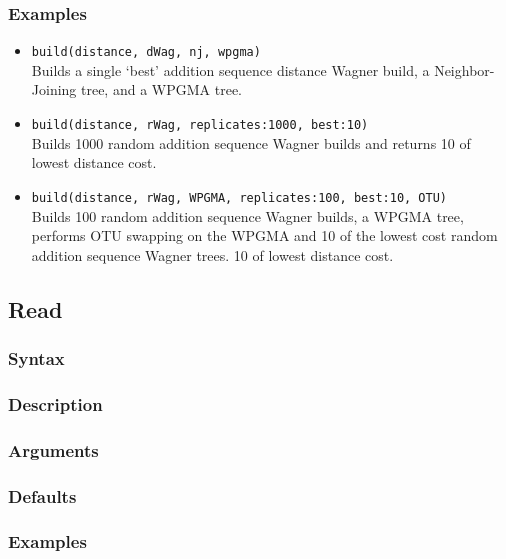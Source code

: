 \documentclass[11pt]{article}
\begin{document}
		\subsubsection{Examples}
			\begin{itemize}
				\item{\texttt{build(distance, dWag, nj, wpgma)}\\Builds a single `best' addition sequence distance Wagner build, a Neighbor-Joining tree, and a WPGMA tree.}
				\item{\texttt{build(distance, rWag, replicates:1000, best:10)}\\Builds 1000 random addition sequence  Wagner builds and returns  
				10 of lowest distance cost.}
				\item{\texttt{build(distance, rWag, WPGMA, replicates:100, best:10, OTU)} \\Builds 100 random addition sequence  Wagner builds, a WPGMA tree, performs OTU swapping on the WPGMA and 10 of the lowest cost random addition sequence Wagner trees. 
			10 of lowest distance cost.}
			\end{itemize}
	\subsection{Read}
		\subsubsection{Syntax}
		\subsubsection{Description}
		\subsubsection{Arguments}
		\subsubsection{Defaults}
		\subsubsection{Examples}
\end{document}
